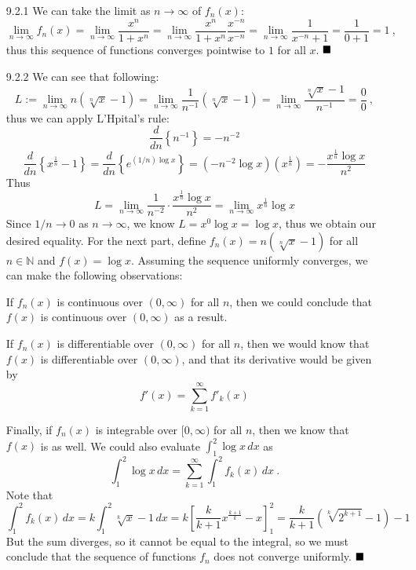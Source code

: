 \documentclass[11pt]{article}
\newcommand{\done}{\ensuremath{
    \strut\hfill\blacksquare
}}
\newcommand{\bracks}[1]{\left[#1\right]}             %
\newcommand{\braces}[1]{\left\{#1\right\}}           %
\newcommand{\parens}[1]{\left(#1\right)}             %
\newcommand{\N}{\mathbb{N}}
\newcommand{\derv}[2]{\dfrac{d#1}{d#2}}
\newcommand{\lm}[1]{\displaystyle\lim_{#1}}
\begin{document}
\pagestyle{fancy}
\fancyhead{}

\normalsize

\begin{itemize}
    \item [9.2.1] We can take the limit as $n\to\infty$ of $f_n(x)$:
    \[\lm{n\to\infty}f_n(x)=\lm{n\to\infty}\frac{x^n}{1+x^n}=\lm{n\to\infty}\frac{x^n}{1+x^n}\frac{x^{-n}}{x^{-n}}=\lm{n\to\infty}\frac{1}{x^{-n}+1}=\frac{1}{0+1}=1\ ,\]
    thus this sequence of functions converges pointwise to $1$ for all $x$. \done

    \item [9.2.2] We can see that following:
    \[L:=\lm{n\to\infty}n\parens{\sqrt[n]{x}-1}=\lm{n\to\infty}\frac{1}{n^{-1}}\parens{\sqrt[n]{x}-1}=\lm{n\to\infty}\frac{\sqrt[n]{x}-1}{n^{-1}}=\frac{0}{0}\ ,\]
    thus we can apply L'Hpital's rule:
    \[\derv{}{n}\braces{n^{-1}}=-n^{-2}\]
    \[\derv{}{n}\braces{x^{\frac{1}{n}}-1}=\derv{}{n}\braces{e^{(1/n)\log x}}=(-n^{-2}\log x)(x^{\frac{1}{n}})=-\frac{x^{\frac{1}{n}}\log x}{n^2}\]
    Thus
    \[L=\lm{n\to\infty}\frac{1}{n^{-2}}\cdot\frac{x^{\frac{1}{n}}\log x}{n^2}=\lm{n\to\infty}x^{\frac{1}{n}}\log x\]
    Since $1/n\to0$ as $n\to\infty$, we know $L=x^0\log x=\log x$, thus we obtain our desired equality. For the next part, define $f_n(x)=n\parens{\sqrt[n]{x}-1}$ for all $n\in\N$ and $f(x)=\log x$. Assuming the sequence uniformly converges, we can make the following observations:

    If $f_n(x)$ is continuous over $(0,\infty)$ for all $n$, then we could conclude that $f(x)$ is continuous over $(0,\infty)$ as a result.

    If $f_n(x)$ is differentiable over $(0,\infty)$ for all $n$, then we would know that $f(x)$ is differentiable over $(0,\infty)$, and that its derivative would be given by
    \[f'(x)=\sum_{k=1}^\infty f'_k(x)\]

    Finally, if $f_n(x)$ is integrable over $[0,\infty)$ for all $n$, then we know that $f(x)$ is as well. We could also evaluate $\int_1^2\log x\,dx$ as
    \[\int_1^2\log x\,dx=\sum_{k=1}^\infty\int_1^2f_k(x)\,dx\ .\]
    Note that
    \[\int_1^2f_k(x)\,dx=k\int_1^2\sqrt[k]{x}-1\,dx=k\bracks{\frac{k}{k+1}x^{\frac{k+1}{k}}-x}_1^2=\frac{k}{k+1}\parens{\sqrt[k]{2^{k+1}}-1}-1\]
    But the sum diverges, so it cannot be equal to the integral, so we must conclude that the sequence of functions $f_n$ does not converge uniformly. \done

\end{itemize}
\end{document}
